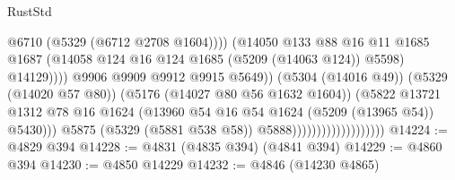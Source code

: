 \begin{lexlean}{RustStd}
\begin{coremodule}
                                                          @6710
                                                          (@5329 (@6712 @2708 @1604))))
                                                      (@14050
                                                        @133
                                                        @88
                                                        @16
                                                        @11
                                                        @1685
                                                        @1687
                                                        (@14058
                                                          @124
                                                          @16
                                                          @124
                                                          @1685
                                                          (@5209 (@14063 @124))
                                                          @5598)
                                                        @14129))))
                                                @9906
                                                @9909
                                                @9912
                                                @9915
                                                @5649))
                                            (@5304 (@14016 @49))
                                            (@5329 (@14020 @57 @80))
                                            (@5176 (@14027 @80 @56 @1632 @1604))
                                            (@5822
                                              @13721
                                              @1312
                                              @78
                                              @16
                                              @1624
                                              (@13960
                                                @54
                                                @16
                                                @54
                                                @1624
                                                (@5209 (@13965 @54))
                                                @5430)))
                                          @5875
                                          (@5329 (@5881 @538 @58))
                                          @5888)))))))))))))))))))
@14224 := @4829 @394
@14228 := @4831 (@4835 @394) (@4841 @394)
@14229 := @4860 @394
@14230 := @4850 @14229
@14232 := @4846 (@14230 @4865)

\end{coremodule}
\end{lexlean}
